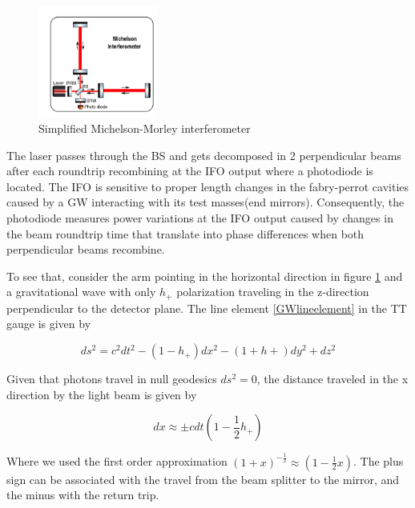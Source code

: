 \begin{figure}[hbt!]
\begin{center}
\includegraphics[width=0.35\textwidth, angle=0]{images/IFO.png}
\captionsetup{width=0.8\textwidth}
\caption{Simplified Michelson-Morley interferometer}
\label{IFO}
\end{center}
\end{figure}

\FloatBarrier

The laser passes through the BS and gets decomposed in 2 perpendicular beams after each roundtrip recombining at the IFO output where a photodiode is located. The IFO is sensitive to proper length changes in the fabry-perrot cavities caused by a GW interacting with its test masses(end mirrors). Consequently, the photodiode measures power variations at the IFO output caused by changes in the beam roundtrip time that translate into phase differences when both perpendicular beams recombine.

To see that, consider the arm pointing in the horizontal direction in figure \ref{IFO} and a gravitational wave with only $h_+$  polarization traveling in the z-direction perpendicular to the detector plane. The line element \ref{GWlineelement} in the TT gauge is given by

\begin{equation}
ds^2 = c^2 dt^2 - (1-h_+) dx^2 - (1+h+) dy^2 + dz^2
\end{equation}

Given that photons travel in null geodesics $ds^2 = 0$, the distance traveled in the x direction by the light beam is given by

\begin{equation}\label{dx}
dx \approx \pm cdt \left(  1-\frac{1}{2} h_+ \right)
\end{equation}

Where we used the first order approximation $(1+x)^{-\frac{1}{2}} \approx (1 - \frac{1}{2} x)$. The plus sign can be associated with the travel from the beam splitter to the mirror, and the minus with the return trip. 

